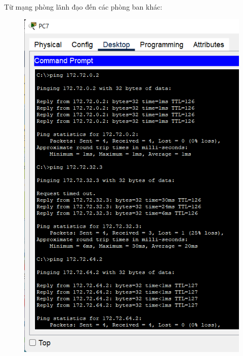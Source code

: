 \begin{enumerate}
\begin{enumerate}
Từ mạng phòng lãnh đạo đến các phòng ban khác:
\begin{figure}[H]
\begin{center}
\includegraphics[scale=.5]{../figures/p2/test-ping-7}

\end{center}
\end{figure}
\end{enumerate}
\end{enumerate}
